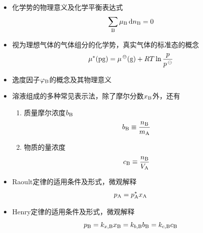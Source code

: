 \documentclass[9pt]{beamer}
\newcommand\A{{\rm A}}
\newcommand\B{{\rm B}}
\newcommand*{\dif}{\mathop{}\!\mathrm{d}}
\begin{document}
	\begin{frame}
	
	\begin{itemize}
	
	\item 化学势的物理意义及化学平衡表达式
	\[
		\sum_\B \mu_\B \dif n_\B = 0 
	\]
	
	\item 视为理想气体的气体组分的化学势，真实气体的标准态的概念
	\[
		\mu^*({\rm pg}) = \mu^{\,\ominus}({\rm g}) + RT \ln{\frac{p}{p^{\,\ominus}}}
	\]
	
	\item 逸度因子$\varphi_\B$的概念及其物理意义
	
	\item 溶液组成的多种常见表示法，除了摩尔分数$x_\B$外，还有
		\begin{enumerate}
		
		\item 质量摩尔浓度$b_\B$
		\[
			b_\B \equiv \frac{ n_\B }{ m_\A }
		\]
		
		\item 物质的量浓度
		\[
			c_\B \equiv \frac{ n_\B }{ V_\A }
		\]
		\end{enumerate}
	
	\item Raoult定律的适用条件及形式，微观解释
	\[
		p_\A = p^*_\A x_\A
	\]
	
	\item Henry定律的适用条件及形式，微观解释
	\[
		p_\B = k_{x,\B} x_\B = k_{b,\B} b_\B = k_{c,\B} c_\B
	\]
	
	\end{itemize}		
	
	\end{frame}
	
\end{document}
